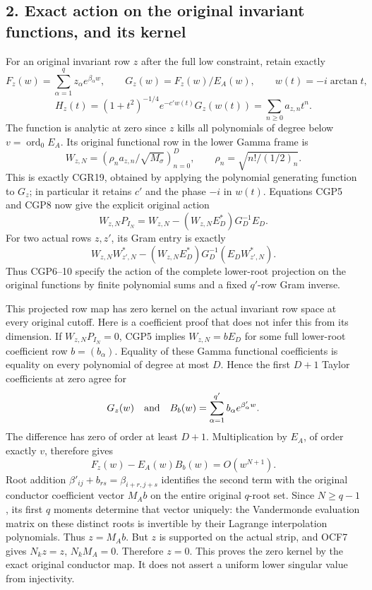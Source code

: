 \documentclass[11pt]{article}
\begin{document}
\subsection{2. Exact action on the original invariant functions, and its kernel}\label{exact-action-on-the-original-invariant-functions-and-its-kernel}

For an original invariant row \(z\) after the full low constraint, retain exactly \[
F_z(w)=\sum_{\alpha=1}^{q}z_\alpha e^{\beta_\alpha w},\qquad
G_z(w)=F_z(w)/E_A(w),\qquad
w(t)=-i\arctan t,
\] \[
H_z(t)=(1+t^2)^{-1/4}e^{-c'w(t)}G_z(w(t))
=\sum_{n\ge0}a_{z,n}t^n.
\tag{CGP7}
\] The function is analytic at zero since \(z\) kills all polynomials of degree below \(v=\operatorname{ord}_0E_A\). Its original functional row in the lower Gamma frame is \[
W_{z,N}=(\rho_na_{z,n}/\sqrt{M_\sigma})_{n=0}^D,
\qquad \rho_n=\sqrt{n!/(1/2)_n}.
\tag{CGP8}
\] This is exactly CGR19, obtained by applying the polynomial generating function to \(G_z\); in particular it retains \(c'\) and the phase \(-i\) in \(w(t)\). Equations CGP5 and CGP8 now give the explicit original action \[
\boxed{W_{z,N}P_{I_N}
=W_{z,N}-(W_{z,N}E_D^*)G_D^{-1}E_D.}
\tag{CGP9}
\] For two actual rows \(z,z'\), its Gram entry is exactly \[
W_{z,N}W_{z',N}^*
-(W_{z,N}E_D^*)G_D^{-1}(E_DW_{z',N}^*).
\tag{CGP10}
\] Thus CGP6--10 specify the action of the complete lower-root projection on the original functions by finite polynomial sums and a fixed \(q'\)-row Gram inverse.

This projected row map has zero kernel on the actual invariant row space at every original cutoff. Here is a coefficient proof that does not infer this from its dimension. If \(W_{z,N}P_{I_N}=0\), CGP5 implies \(W_{z,N}=bE_D\) for some full lower-root coefficient row \(b=(b_\alpha)\). Equality of these Gamma functional coefficients is equality on every polynomial of degree at most \(D\). Hence the first \(D+1\) Taylor coefficients at zero agree for \[
G_z(w)\quad\hbox{and}\quad B_b(w)=\sum_{\alpha=1}^{q'}
b_\alpha e^{\beta'_\alpha w}.
\] The difference has zero of order at least \(D+1\). Multiplication by \(E_A\), of order exactly \(v\), therefore gives \[
F_z(w)-E_A(w)B_b(w)=O(w^{N+1}).
\tag{CGP11}
\] Root addition \(\beta'_{ij}+b_{rs}=\beta_{i+r,j+s}\) identifies the second term with the original conductor coefficient vector \(M_Ab\) on the entire original \(q\)-root set. Since \(N\ge q-1\), its first \(q\) moments determine that vector uniquely: the Vandermonde evaluation matrix on these distinct roots is invertible by their Lagrange interpolation polynomials. Thus \(z=M_Ab\). But \(z\) is supported on the actual strip, and OCF7 gives \(N_kz=z\), \(N_kM_A=0\). Therefore \(z=0\). This proves the zero kernel by the exact original conductor map. It does not assert a uniform lower singular value from injectivity.
\end{document}

